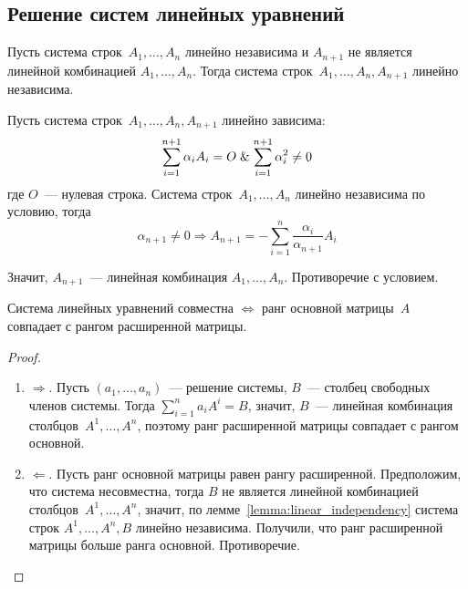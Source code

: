 \subsection{Решение систем линейных уравнений}
\begin{lemma}
\label{lemma:linear_independency}
Пусть система строк~$A_1, \ldots, A_n$ линейно независима и $A_{n+1}$ не является линейной комбинацией $A_1, \ldots, A_n$. Тогда система строк~$A_1, \ldots, A_n, A_{n+1}$ линейно независима.
\end{lemma}
\begin{proofcontra}
Пусть система строк~$A_1, \ldots, A_n, A_{n+1}$ линейно зависима:
\begin{equation*}
\sum_{i=1}^{n+1} \alpha_i A_i = O \mathrel{\&}
\sum_{i=1}^{n+1} \alpha_i^2 \neq 0
\end{equation*}
где $O$~--- нулевая строка.
Система строк~$A_1, \ldots, A_n$ линейно независима по условию, тогда
\begin{equation*}
\alpha_{n+1} \neq 0 \Rightarrow A_{n+1} = -\sum_{i=1}^n \frac{\alpha_i}{\alpha_{n+1}} A_i
\end{equation*}

Значит, $A_{n+1}$~--- линейная комбинация $A_1, \ldots, A_n$.
Противоречие с условием.
\end{proofcontra}

\begin{theorem}
Система линейных уравнений совместна $\Leftrightarrow$ ранг основной матрицы~$A$ совпадает с рангом расширенной матрицы.
\end{theorem}
\begin{proof}
\begin{enumerate}
	\item $\Rightarrow$. Пусть $(a_1, \ldots, a_n)$~--- решение системы, $B$~--- столбец свободных членов системы.
	Тогда $\displaystyle \sum_{i=1}^n a_i A^i = B$, значит, $B$~--- линейная комбинация столбцов~$A^1, \ldots, A^n$, поэтому ранг расширенной матрицы совпадает с рангом основной.
	
	\item $\Leftarrow$. Пусть ранг основной матрицы равен рангу расширенной.
	Предположим, что система несовместна, тогда $B$ не является линейной комбинацией столбцов~$A^1, \ldots, A^n$, значит, по лемме~\ref*{lemma:linear_independency} система строк $A^1, \ldots, A^n, B$ линейно независима.
	Получили, что ранг расширенной матрицы больше ранга основной.
	Противоречие.
\end{enumerate}
\end{proof}

